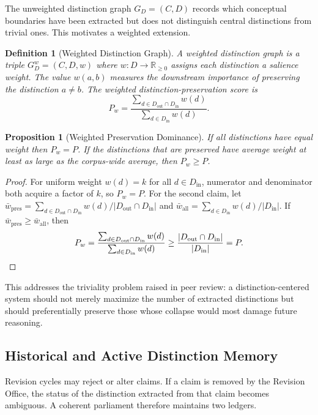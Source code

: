 \documentclass[12pt, a4paper]{article}
\newtheorem{definition}{Definition}[section]
\newtheorem{proposition}{Proposition}[section]
\theoremstyle{principle}
\theoremstyle{definition}
\begin{document}
The unweighted distinction graph $G_D = (C, D)$ records which conceptual boundaries
have been extracted but does not distinguish central distinctions from trivial ones.
This motivates a weighted extension.

\begin{definition}[Weighted Distinction Graph]
A \emph{weighted distinction graph} is a triple $G_D^w = (C, D, w)$ where
$w : D \to \mathbb{R}_{\geq 0}$ assigns each distinction a salience weight.
The value $w(a, b)$ measures the downstream importance of preserving the distinction
$a \neq b$. The \emph{weighted distinction-preservation score} is
\[
P_w = \frac{\sum_{d \in D_{\mathrm{out}} \cap D_{\mathrm{in}}} w(d)}
           {\sum_{d \in D_{\mathrm{in}}} w(d)}.
\]
\end{definition}

\begin{proposition}[Weighted Preservation Dominance]
\label{prop:weighted}
If all distinctions have equal weight then $P_w = P$. If the distinctions that
are preserved have average weight at least as large as the corpus-wide average,
then $P_w \geq P$.
\end{proposition}

\begin{proof}
For uniform weight $w(d) = k$ for all $d \in D_{\mathrm{in}}$, numerator and
denominator both acquire a factor of $k$, so $P_w = P$. For the second claim,
let $\bar{w}_{\mathrm{pres}} = \sum_{d \in D_{\mathrm{out}} \cap D_{\mathrm{in}}} w(d)
/ |D_{\mathrm{out}} \cap D_{\mathrm{in}}|$ and
$\bar{w}_{\mathrm{all}} = \sum_{d \in D_{\mathrm{in}}} w(d) / |D_{\mathrm{in}}|$.
If $\bar{w}_{\mathrm{pres}} \geq \bar{w}_{\mathrm{all}}$, then
\[
P_w = \frac{\sum_{d \in D_{\mathrm{out}} \cap D_{\mathrm{in}}} w(d)}
           {\sum_{d \in D_{\mathrm{in}}} w(d)}
    \geq \frac{|D_{\mathrm{out}} \cap D_{\mathrm{in}}|}{|D_{\mathrm{in}}|} = P. \qedhere
\]
\end{proof}

This addresses the triviality problem raised in peer review: a distinction-centered
system should not merely maximize the number of extracted distinctions but should
preferentially preserve those whose collapse would most damage future reasoning.

\subsection{Historical and Active Distinction Memory}

Revision cycles may reject or alter claims. If a claim is removed by the Revision
Office, the status of the distinction extracted from that claim becomes ambiguous.
A coherent parliament therefore maintains two ledgers.
\end{document}
